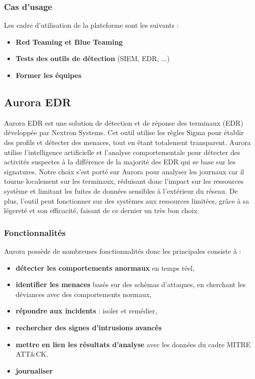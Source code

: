 \documentclass[12pt,letterpaper]{article}
\begin{document}
\subsubsection{Cas d'usage}

Les cadre d'utilisation de la plateforme sont les suivants :
\begin{itemize}
    \item \textbf{Red Teaming et Blue Teaming}
    \item \textbf{Tests des outils de détection} (SIEM, EDR, ...)
    \item \textbf{Former les équipes} 
\end{itemize}

\subsection{Aurora EDR}

Aurora EDR est une solution de détection et de réponse des terminaux (EDR) développée par Nextron Systems. Cet outil utilise les règles Sigma pour établir des profils et détecter des menaces, tout en étant totalement transparent. Aurora utilise l'intelligence artificielle et l'analyse comportementale pour détecter des activités suspectes à la différence de la majorité des EDR qui se base sur les signatures. 
Notre choix s'est porté sur Aurora pour analyser les journaux car il tourne localement sur les terminaux, réduisant donc l'impact sur les ressources système et limitant les fuites de données sensibles à l'extérieur du réseau. De plus, l'outil peut fonctionner sur des systèmes aux ressources limitées, grâce à sa légereté et son efficacité, faisant de ce dernier un très bon choix.

\subsubsection{Fonctionnalités}

Aurora possède de nombreuses fonctionnalités donc les principales consiste à :
\begin{itemize}
    \item \textbf{détecter les comportements anormaux} en temps réel,
    \item \textbf{identifier les menaces} basés sur des schémas d'attaques, en cherchant les déviances avec des comportements normaux,
    \item \textbf{répondre aux incidents} : isoler et remédier,
    \item \textbf{rechercher des signes d'intrusions avancés}
    \item \textbf{mettre en lien les résultats d'analyse} avec les données du cadre MITRE ATT\&CK.
    \item \textbf{journaliser}
\end{itemize}
\end{document}
